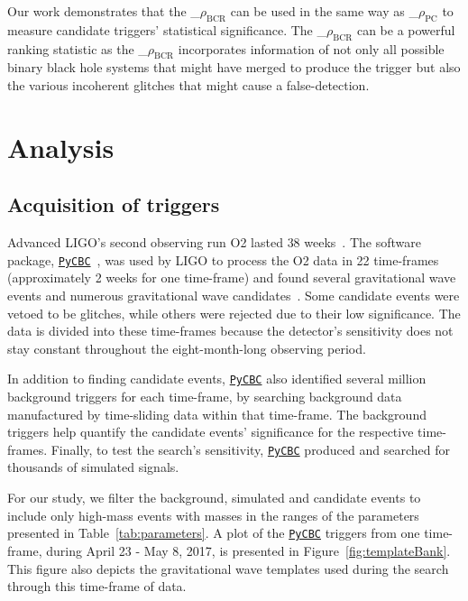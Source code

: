 \documentclass[%
 nofootinbib,
 amsmath,amssymb,
 aps,
 twocolumn
]{revtex4-2}
\newcommand{\pycbc}{{\sc \href{https://pycbc.org/}{\texttt{PyCBC}}}\xspace}
\newcommand{\mathcmd}[1]{{\sc \relax\ifmmode#1\else $#1$\fi}\xspace}
\newcommand{\bcr}{\mathcmd{\rho_\text{BCR}}}
\newcommand{\pycbcstat}{\mathcmd{\rho_\text{PC}}}
\begin{document}
Our work demonstrates that the \bcr can be used in the same way as \pycbcstat to measure candidate triggers' statistical significance.  The \bcr can be a powerful ranking statistic as the \bcr incorporates information of not only all possible binary black hole systems that might have merged to produce the trigger but also the various incoherent glitches that might cause a false-detection. 


\section{Analysis}\label{sec:Analysis}

\subsection{Acquisition of triggers}
Advanced LIGO's second observing run O2 lasted $38$ weeks~\cite{GWOSC}. The software package, \pycbc~\cite{pycbc_code}, was used by LIGO to process the O2 data in 22 time-frames (approximately 2 weeks for one time-frame) and found several gravitational wave events and numerous gravitational wave candidates~\cite{pycbc_og0, pycbc_og1, pycbc_og2, pycbc_og3, pycbc_og4, pycbc_og5, pycbc_og6}. Some candidate events were vetoed to be glitches, while others were rejected due to their low significance. The data is divided into these time-frames because the detector's sensitivity does not stay constant throughout the eight-month-long observing period.

In addition to finding candidate events, \pycbc also identified several million background triggers for each time-frame, by searching background data manufactured by time-sliding data within that time-frame. The background triggers help quantify the candidate events' significance for the respective time-frames. Finally, to test the search's sensitivity, \pycbc produced and searched for thousands of simulated signals. 

For our study, we filter the background, simulated and candidate events to include only high-mass events with masses in the ranges of the parameters presented in Table~\ref{tab:parameters}. A plot of the \pycbc triggers from one time-frame, during April 23 - May 8, 2017, is presented in Figure~\ref{fig:templateBank}. This figure also depicts the gravitational wave templates used during the search through this time-frame of data. 
\end{document}
